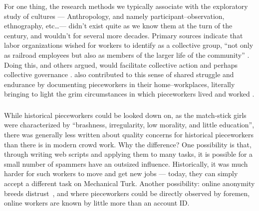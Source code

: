 \documentclass[trackingWork]{subfiles}
\begin{document}
For one thing, the research methods we typically associate with the exploratory study of cultures
--- Anthropology, and namely participant--observation, ethnography, etc\dots ---
didn't exist quite as we know them at the turn of the  century, and wouldn't for several more decades.
Primary sources indicate that labor organizations wished for workers to identify as a collective group, 
``not only as railroad employees but also as members of the larger life of the community''
\cite{american1921problem}.
Doing this, 
\citeauthor{ostrom1990governing} and others argued,
would facilitate collective action and perhaps collective governance
\cite{ostrom1990governing,russell1982collective,olsonlogic}.
\citeauthor{riisOtherSideLives} also contributed to this sense of shared struggle and endurance
by documenting pieceworkers in their home--workplaces,
literally bringing to light the grim circumstances in which pieceworkers lived and worked
\cite{riisOtherSideLives}.




\subsubsection{\whatchanged}

\begin{comment}
	*workers make little money but love autonomy --- workers make little money
	workers blamed for quality --- ???
	both cases, sociality is hard
	*collective action hard --- collective action succeeded

	- algorithms, not managers
\end{comment}

While historical pieceworkers could be looked down on, as the match-stick girls were characterized by ``brashness, irregularity, low morality, and little education'', there was generally less written about quality concerns for historical pieceworkers than there is in modern crowd work. 
Why the difference? 
One possibility is that, through writing web scripts and applying them to many tasks, it is possible for a small number of spammers have an outsized influence.
Historically, it was much harder for such workers to move and get new jobs --- today, they can simply accept a different task on Mechanical Turk.
Another possibility: online anonymity breeds distrust~\cite{friedman2000trust}, and where pieceworkers could be directly observed by foremen, online workers are known by little more than an account ID.
\end{document}
